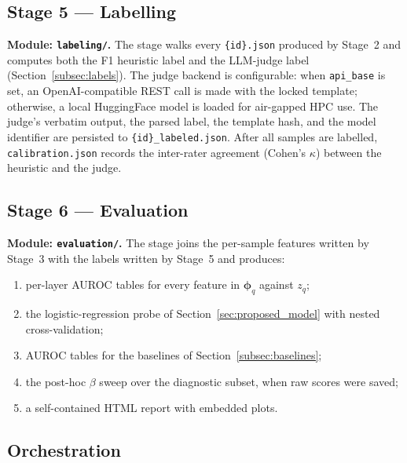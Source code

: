 \subsection{Stage 5 — Labelling}
\label{subsec:stage5}

\textbf{Module: \texttt{labeling/}.} The stage walks every
\texttt{\{id\}.json} produced by Stage~2 and computes both the F1
heuristic label and the LLM-judge label
(Section~\ref{subsec:labels}). The judge backend is configurable:
when \texttt{api\_base} is set, an OpenAI-compatible REST call is made
with the locked template; otherwise, a local HuggingFace model is loaded
for air-gapped HPC use. The judge's verbatim output, the parsed label,
the template hash, and the model identifier are persisted to
\texttt{\{id\}\_labeled.json}. After all samples are labelled,
\texttt{calibration.json} records the inter-rater agreement
(Cohen's $\kappa$) between the heuristic and the judge.

\subsection{Stage 6 — Evaluation}
\label{subsec:stage6}

\textbf{Module: \texttt{evaluation/}.} The stage joins the per-sample
features written by Stage~3 with the labels written by Stage~5 and
produces:
\begin{enumerate}[leftmargin=*]
    \item per-layer AUROC tables for every feature in
          $\boldsymbol{\phi}_q$ against $z_q$;
    \item the logistic-regression probe of
          Section~\ref{sec:proposed_model} with nested cross-validation;
    \item AUROC tables for the baselines of
          Section~\ref{subsec:baselines};
    \item the post-hoc $\beta$ sweep over the diagnostic subset, when
          raw scores were saved;
    \item a self-contained HTML report with embedded plots.
\end{enumerate}

\subsection{Orchestration}
\label{subsec:orchestration}

